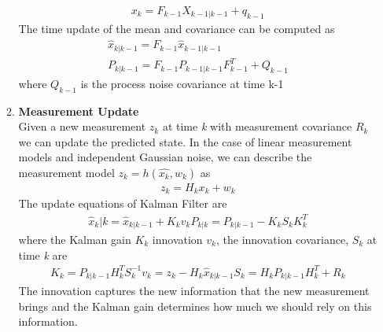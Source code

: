 \begin{itemize}
\begin{enumerate}
                                    \begin{align}
                                        x_k = F_{k-1} X_{k-1 | k-1} + q_{k-1}
                                    \end{align}
                                    The time update of the mean and covariance can be computed as 
                                    \begin{align}
                                        \hat{x}_{k|k-1} = F_{k-1} \hat{x}_{k-1|k-1} \\ 
                                        P_{k|k-1} = F_{k-1} P_{k-1|k-1} F_{k-1}^T + Q_{k-1}
                                    \end{align}
                                    where \emph{$Q_{k-1}$} is the process noise covariance at time k-1
                                \item \textbf{Measurement Update} \\ 
                                    \vspace{3mm}
                                    Given a new measurement \emph{$z_k$} at time \emph{k} with measurement covariance \emph{$R_k$} we can update the predicted state. In the case of linear measurement models and independent Gaussian noise, 
                                    we can describe the measurement model \emph{$z_k = h(\hat{x_k}, w_k)$} as
                                    \begin{align}
                                        z_k = H_k x_k + w_k
                                    \end{align}  
                                    The update equations of Kalman Filter are 
                                    \begin{align}
                                        \hat{x}_k|k = \hat{x}_{k|k-1} + K_k v_k
                                        P_{k|k} = P_{k|k-1} - K_k S_k K_k^T
                                    \end{align}
                                    where the Kalman gain \emph{$K_k$} innovation \emph{$v_k$}, the innovation covariance, \emph{$S_k$} at time \emph{k} are
                                    \begin{align}
                                        K_k = P_{k|k-1} H_k^T S_k^{-1}
                                        v_k = z_k - H_k \hat{x}_{k|k-1}
                                        S_k = H_k P_{k|k-1} H_k^T + R_k
                                    \end{align}
                                    The innovation captures the new information that the new measurement brings and the Kalman gain determines how much we should rely on this information.
                            \end{enumerate}

\end{itemize}
